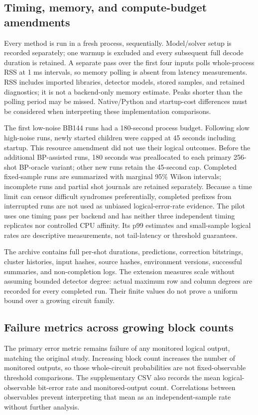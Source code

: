 \subsection{Timing, memory, and compute-budget amendments}
Every method is run in a fresh process, sequentially. Model/solver setup is recorded separately; one warmup is excluded and every subsequent full decode duration is retained. A separate pass over the first four inputs polls whole-process RSS at 1 ms intervals, so memory polling is absent from latency measurements. RSS includes imported libraries, detector models, stored samples, and retained diagnostics; it is not a backend-only memory estimate. Peaks shorter than the polling period may be missed. Native/Python and startup-cost differences must be considered when interpreting these implementation comparisons.

The first low-noise BB144 runs had a 180-second process budget. Following slow high-noise runs, newly started children were capped at 45 seconds including startup. This resource amendment did not use their logical outcomes. Before the additional BP-assisted runs, 180 seconds was preallocated to each primary 256-shot BP-oracle variant; other new runs retain the 45-second cap. Completed fixed-sample runs are summarized with marginal 95\% Wilson intervals; incomplete runs and partial shot journals are retained separately. Because a time limit can censor difficult syndromes preferentially, completed prefixes from interrupted runs are not used as unbiased logical-error-rate evidence. The pilot uses one timing pass per backend and has neither three independent timing replicates nor controlled CPU affinity. Its p99 estimates and small-sample logical rates are descriptive measurements, not tail-latency or threshold guarantees.

The archive contains full per-shot durations, predictions, correction bitstrings, cluster histories, input hashes, source hashes, environment versions, successful summaries, and non-completion logs. The extension measures scale without assuming bounded detector degree: actual maximum row and column degrees are recorded for every completed run. Their finite values do not prove a uniform bound over a growing circuit family.


\subsection{Failure metrics across growing block counts}
The primary error metric remains failure of any monitored logical output, matching the original study. Increasing block count increases the number of monitored outputs, so those whole-circuit probabilities are not fixed-observable threshold comparisons. The supplementary CSV also records the mean logical-observable bit-error rate and monitored-output count. Correlations between observables prevent interpreting that mean as an independent-sample rate without further analysis.

